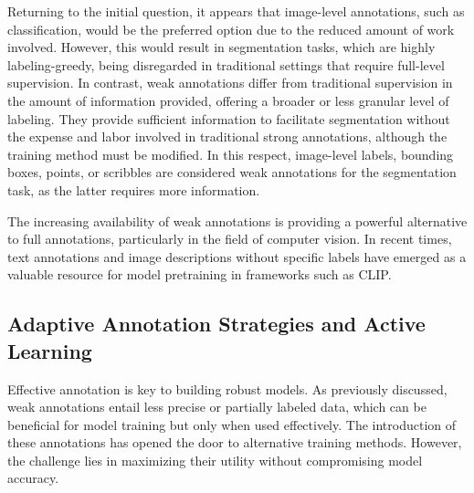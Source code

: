

Returning to the initial question, it appears that image-level annotations, such as classification, would be the preferred option due to the reduced amount of work involved. However, this would result in segmentation tasks, which are highly labeling-greedy, being disregarded in traditional settings that require full-level supervision. In contrast, weak annotations differ from traditional supervision in the amount of information provided, offering a broader or less granular level of labeling. They provide sufficient information to facilitate segmentation without the expense and labor involved in traditional strong annotations, although the training method must be modified. In this respect, image-level labels, bounding boxes, points, or scribbles are considered weak annotations for the segmentation task, as the latter requires more information.

The increasing availability of weak annotations is providing a powerful alternative to full annotations, particularly in the field of computer vision. In recent times, text annotations and image descriptions without specific labels have emerged as a valuable resource for model pretraining in frameworks such as CLIP. 

\subsection{Adaptive Annotation Strategies and Active Learning}
Effective annotation is key to building robust models. As previously discussed, weak annotations entail less precise or partially labeled data, which can be beneficial for model training but only when used effectively. The introduction of these annotations has opened the door to alternative training methods. However, the challenge lies in maximizing their utility without compromising model accuracy. 

